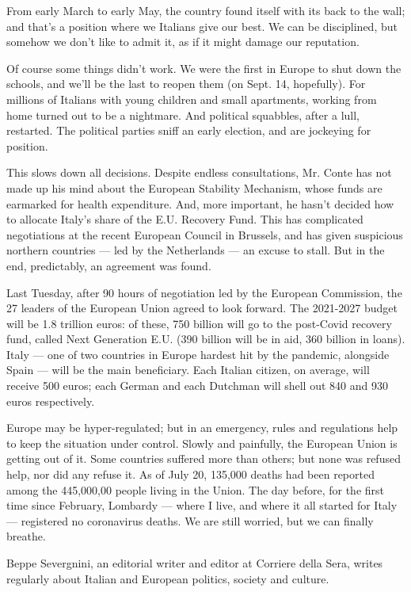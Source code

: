 From early March to early May, the country found itself with its back to
the wall; and that's a position where we Italians give our best. We can
be disciplined, but somehow we don't like to admit it, as if it might
damage our reputation.

Of course some things didn't work. We were the first in Europe to shut
down the schools, and we'll be the last to reopen them (on Sept. 14,
hopefully). For millions of Italians with young children and small
apartments, working from home turned out to be a nightmare. And
political squabbles, after a lull, restarted. The political parties
sniff an early election, and are jockeying for position.

This slows down all decisions. Despite endless consultations, Mr. Conte
has not made up his mind about the European Stability Mechanism, whose
funds are earmarked for health expenditure. And, more important, he
hasn't decided how to allocate Italy's share of the E.U. Recovery Fund.
This has complicated negotiations at the recent European Council in
Brussels, and has given suspicious northern countries --- led by the
Netherlands --- an excuse to stall. But in the end, predictably, an
agreement was found.

Last Tuesday, after 90 hours of negotiation led by the European
Commission, the 27 leaders of the European Union agreed to look forward.
The 2021-2027 budget will be 1.8 trillion euros: of these, 750 billion
will go to the post-Covid recovery fund, called Next Generation E.U.
(390 billion will be in aid, 360 billion in loans). Italy --- one of two
countries in Europe hardest hit by the pandemic, alongside Spain ---
will be the main beneficiary. Each Italian citizen, on average, will
receive 500 euros; each German and each Dutchman will shell out 840 and
930 euros respectively.

Europe may be hyper-regulated; but in an emergency, rules and
regulations help to keep the situation under control. Slowly and
painfully, the European Union is getting out of it. Some countries
suffered more than others; but none was refused help, nor did any refuse
it. As of July 20, 135,000 deaths had been reported among the 445,000,00
people living in the Union. The day before, for the first time since
February, Lombardy --- where I live, and where it all started for Italy
--- registered no coronavirus deaths. We are still worried, but we can
finally breathe.

Beppe Severgnini, an editorial writer and editor at Corriere della Sera,
writes regularly about Italian and European politics, society and
culture.

